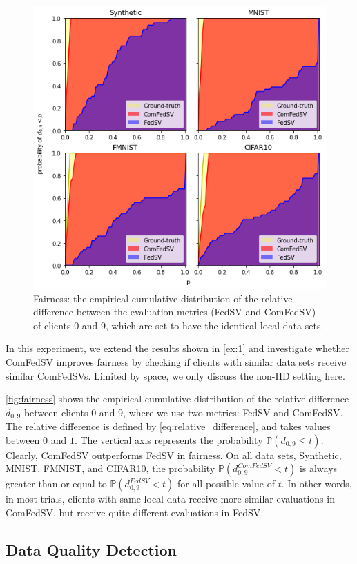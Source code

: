 \begin{figure}[t]
    \centering
    \includegraphics[width=.8\textwidth]{./figures/equal_data.png}
    \caption{Fairness: the empirical cumulative distribution of the relative difference between the evaluation metrics (FedSV and ComFedSV) of clients 0 and 9, which are set to have the identical local data sets.}
    \label{fig:fairness}
\end{figure}

In this experiment, we extend the results shown in \autoref{ex:1} and investigate whether ComFedSV improves fairness by checking if clients with similar data sets receive similar ComFedSVs. Limited by space, we only discuss the non-IID setting here.

\autoref{fig:fairness} shows the empirical cumulative distribution of the relative difference $d_{0,9}$ between clients 0 and 9, where we use two metrics: FedSV and ComFedSV. The relative difference is defined by \eqref{eq:relative_difference}, and takes values between $0$ and $1$. The vertical axis represents the probability $\mathbb{P}(d_{0,9} \leq t)$. Clearly, ComFedSV outperforms FedSV in fairness. On all data sets, Synthetic, MNIST, FMNIST, and CIFAR10, the probability $\mathbb{P}(d_{0,9}^{ComFedSV} < t)$ is always greater than or equal to $\mathbb{P}(d_{0,9}^{FedSV} < t)$ for all possible value of $t$. In other words, in most trials, clients with same local data receive more similar evaluations in ComFedSV, but receive quite different evaluations in FedSV.

\subsection{Data Quality Detection} \label{sec:7.6.3}

